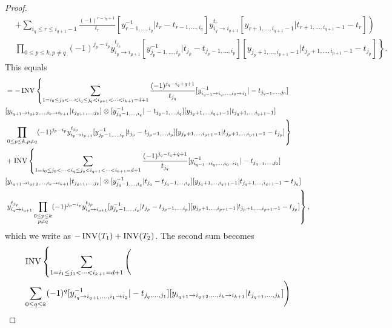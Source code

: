 \begin{proof}
\begin{equation}
\begin{aligned}
&+\left.\sum_{i_q\leq r\leq i_{q+1}-1}\frac{(-1)^{r-i_q+1}}{t_r}[y_{r-1,\dots,i_q}^{-1}|t_r-t_{r-1,\dots,i_q}]y_{i_q\to i_{q+1}}^{t_r}[y_{r+1,\dots,i_{q+1}-1}|t_{r+1,\dots,i_{q+1}-1}-t_r]
\right)\\
&\left.\prod_{0\leq p\leq k,p\neq q}(-1)^{j_p-i_p}y_{i_p\to i_{p+1}}^{t_{j_p}}[y_{j_p-1,\dots,i_p}^{-1}|t_{j_p}-t_{j_p-1,\dots,i_p}][y_{j_p+1,\dots,i_{p+1}-1}|t_{j_p+1,\dots,i_{p+1}-1}-t_{j_p}]\right\}.
\end{aligned}
\end{equation}
This equals
\begin{equation}
\begin{aligned}
&=-\operatorname{INV}\left\{\sum_{1=i_0\leq j_0<\cdots<i_q\leq j_q<i_{q+1}<\cdots<i_{k+1}=d+1}\frac{(-1)^{j_q-i_q+q+1}}{t_{j_q}}[y_{i_{q-1}\to i_q,\dots,i_0\to i_1}^{-1}|-t_{j_{q-1},\dots,j_0}]\right.\\
&[y_{i_{q+1}\to i_{q+2},\dots,i_k\to i_{k+1}}|t_{j_{q+1},\dots,j_k}]\otimes[y_{j_q-1,\dots,i_q}^{-1}|-t_{j_q-1,\dots,i_q}][y_{j_q+1,\dots,i_{q+1}-1}|t_{j_q+1,\dots,i_{q+1}-1}]\\
&\left.\prod_{0\leq p\leq k,p\neq q}(-1)^{j_p-i_p}y_{i_p\to i_{p+1}}^{t_{j_p}}[y_{j_p-1,\dots,i_p}^{-1}|t_{j_p}-t_{j_p-1,\dots,i_p}][y_{j_p+1,\dots,i_{p+1}-1}|t_{j_p+1,\dots,i_{p+1}-1}-t_{j_p}]\right\}\\
&+\operatorname{INV}\left\{\sum_{1=i_0\leq j_0<\cdots<i_q\leq j_q<i_{q+1}<\cdots<i_{k+1}=d+1}\frac{(-1)^{j_q-i_q+q+1}}{t_{j_q}}[y_{i_{q-1}\to i_q,\dots,i_0\to i_1}^{-1}|-t_{j_{q-1},\dots,j_0}]\right.\\
&[y_{i_{q+1}\to i_{q+2},\dots,i_k\to i_{k+1}}|t_{j_{q+1},\dots,j_k}]\otimes[y_{j_q-1,\dots,i_q}^{-1}|t_{j_q}-t_{j_q-1,\dots,i_q}][y_{j_q+1,\dots,i_{q+1}-1}|t_{j_q+1,\dots,i_{q+1}-1}-t_{j_q}]\\
&\left.y_{i_q\to i_{q+1}}^{t_{j_q}}\prod_{\substack{0\leq p\leq k\\p\neq q}}(-1)^{j_p-i_p}y_{i_p\to i_{p+1}}^{t_{j_p}}[y_{j_p-1,\dots,i_p}^{-1}|t_{j_p}-t_{j_p-1,\dots,i_p}][y_{j_p+1,\dots,i_{p+1}-1}|t_{j_p+1,\dots,i_{p+1}-1}-t_{j_p}]\right\},
\end{aligned}
\end{equation}
which we write as $-\operatorname{INV}(T_1)+\operatorname{INV}(T_2)$. The second sum becomes
\begin{equation}
\begin{aligned}
&\INV\left\{\sum_{1=i_1\leq j_1<\dots<i_{k+1}=d+1}\Bigg(\right.\\
&\sum_{0\leq q\leq k}(-1)^q[y_{i_q\to i_{q+1},\dots,i_1\to i_2}^{-1}|-t_{j_q,\dots,j_1}][y_{i_{q+1}\to i_{q+2},\dots,i_k\to i_{k+1}}|t_{j_{q+1},\dots,j_k}]\Bigg)\\

\end{aligned}
\end{equation}
\end{proof}
